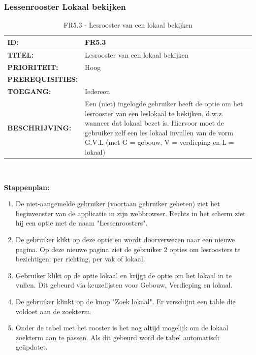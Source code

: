 \subsubsection{Lessenrooster Lokaal bekijken} 
\noindent\begin{table}[H]
            \begin{tabular}{l | p{10cm}}
                \textbf{ID:} & FR5.3 \\ \hline
                \textbf{TITEL:} & Lesrooster van een lokaal bekijken\\ \hline
                \textbf{PRIORITEIT:} &  Hoog \\ \hline
                \textbf{PREREQUISITIES:} & \\ \hline
                \textbf{TOEGANG:} &  Iedereen \\ \hline
                \textbf{BESCHRIJVING:} & Een (niet) ingelogde gebruiker heeft de optie om het lesrooster van een leslokaal te bekijken, d.w.z. wanneer dat lokaal bezet is. Hiervoor moet de gebruiker zelf een les lokaal invullen van de vorm G.V.L (met G = gebouw, V = verdieping en L = lokaal)\\
            \end{tabular}\\
            \caption{FR5.3 - Lesrooster van een lokaal bekijken}
            \label{tab:FR5.3 - Lesrooster van een lokaal bekijken}
        \end{table}
        
\textbf{Stappenplan:}
	\begin{enumerate}
	\item De niet-aangemelde gebruiker (voortaan gebruiker geheten) ziet het beginvenster van de applicatie in zijn webbrowser. Rechts in het scherm ziet hij een optie met de naam "Lessenroosters".
		\item De gebruiker klikt op deze optie en wordt doorverwezen naar een nieuwe pagina. Op deze nieuwe pagina ziet de gebruiker 2 opties om lesroosters te bezichtigen: per richting, per vak of lokaal.
		\item Gebruiker klikt op de optie lokaal en krijgt de optie om het lokaal in te vullen. Dit gebeurd via keuzelijsten voor Gebouw, Verdieping en lokaal.
		\item De gebruiker klinkt  op de knop "Zoek lokaal". Er verschijnt een table die voldoet aan de zoekterm. 
		\item Onder de tabel met het rooster is het nog altijd mogelijk om de lokaal zoekterm aan te passen. Als dit gebeurd word de tabel automatisch geüpdatet. 		
	\end{enumerate}

